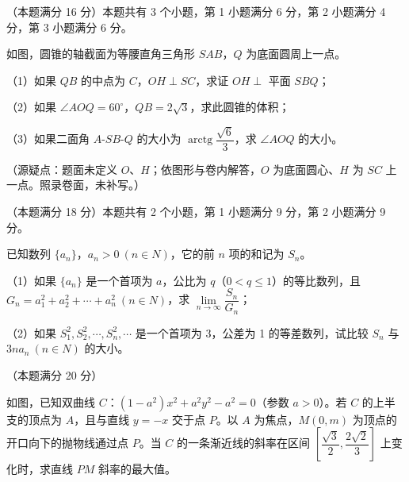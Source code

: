 \Needspace{0.4\textheight}
\begin{question}
（本题满分 16 分）本题共有 3 个小题，第 1 小题满分 6 分，第 2 小题满分 4 分，第 3 小题满分 6 分。

如图，圆锥的轴截面为等腰直角三角形 $SAB$，$Q$ 为底面圆周上一点。

（1）如果 $QB$ 的中点为 $C$，$OH\perp SC$，求证 $OH\perp$ 平面 $SBQ$；

（2）如果 $\angle AOQ=60^{\circ}$，$QB=2\sqrt{3}$，求此圆锥的体积；

（3）如果二面角 $A\text{-}SB\text{-}Q$ 的大小为 $\operatorname{arctg}\dfrac{\sqrt{6}}{3}$，求 $\angle AOQ$ 的大小。
\nopagebreak[4]
\begin{center}\end{center}
\nopagebreak[4]
（源疑点：题面未定义 $O$、$H$；依图形与卷内解答，$O$ 为底面圆心、$H$ 为 $SC$ 上一点。照录卷面，未补写。）

\end{question}
\begin{question}
（本题满分 18 分）本题共有 2 个小题，第 1 小题满分 9 分，第 2 小题满分 9 分。

已知数列 $\{a_{n}\}$，$a_{n}>0\ (n\in N)$，它的前 $n$ 项的和记为 $S_{n}$。

（1）如果 $\{a_{n}\}$ 是一个首项为 $a$，公比为 $q$（$0<q\le 1$）的等比数列，且 $G_{n}=a_{1}^{2}+a_{2}^{2}+\cdots+a_{n}^{2}\ (n\in N)$，求 $\lim\limits_{n\to\infty}\dfrac{S_{n}}{G_{n}}$；

（2）如果 $S_{1}^{2},S_{2}^{2},\cdots,S_{n}^{2},\cdots$ 是一个首项为 3，公差为 1 的等差数列，试比较 $S_{n}$ 与 $3na_{n}\ (n\in N)$ 的大小。

\Needspace{0.4\textheight}
\end{question}
\begin{question}
（本题满分 20 分）

如图，已知双曲线 $C$：$(1-a^{2})x^{2}+a^{2}y^{2}-a^{2}=0$（参数 $a>0$）。若 $C$ 的上半支的顶点为 $A$，且与直线 $y=-x$ 交于点 $P$。以 $A$ 为焦点，$M(0,m)$ 为顶点的开口向下的抛物线通过点 $P$。当 $C$ 的一条渐近线的斜率在区间 $\left[\dfrac{\sqrt{3}}{2},\dfrac{2\sqrt{2}}{3}\right]$ 上变化时，求直线 $PM$ 斜率的最大值。
\nopagebreak[4]
\begin{center}\end{center}
\nopagebreak[4]

\end{question}